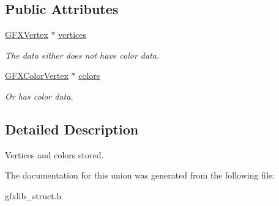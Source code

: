 \subsection*{Public Attributes}
\begin{DoxyCompactItemize}
\item 
\hyperlink{structGFXVertex}{G\+F\+X\+Vertex} $\ast$ \hyperlink{unionGFXVertexList_1_1VDAT_a36f127f0818e0144f1510e1dc466b234}{vertices}\hypertarget{unionGFXVertexList_1_1VDAT_a36f127f0818e0144f1510e1dc466b234}{}\label{unionGFXVertexList_1_1VDAT_a36f127f0818e0144f1510e1dc466b234}

\begin{DoxyCompactList}\small\item\em The data either does not have color data. \end{DoxyCompactList}\item 
\hyperlink{structGFXColorVertex}{G\+F\+X\+Color\+Vertex} $\ast$ \hyperlink{unionGFXVertexList_1_1VDAT_a8b06fd4ec1a7bdee9f64f94ace770ad3}{colors}\hypertarget{unionGFXVertexList_1_1VDAT_a8b06fd4ec1a7bdee9f64f94ace770ad3}{}\label{unionGFXVertexList_1_1VDAT_a8b06fd4ec1a7bdee9f64f94ace770ad3}

\begin{DoxyCompactList}\small\item\em Or has color data. \end{DoxyCompactList}\end{DoxyCompactItemize}


\subsection{Detailed Description}
Vertices and colors stored. 

The documentation for this union was generated from the following file\+:\begin{DoxyCompactItemize}
\item 
gfxlib\+\_\+struct.\+h\end{DoxyCompactItemize}

